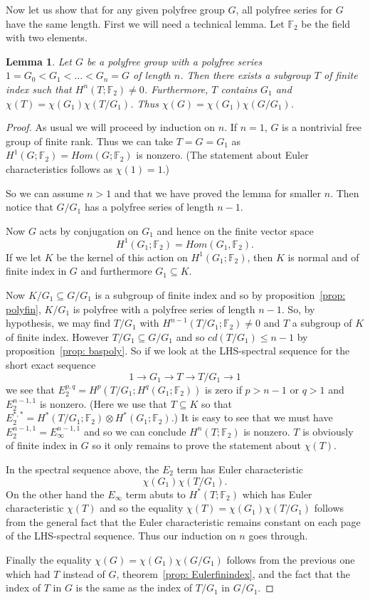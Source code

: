 \documentclass{amsart}
\newtheorem{lem}[thm]{Lemma}
\begin{document}
Now let us show that for any given polyfree group $G$, all polyfree series
for $G$ have the same length. First we will need a technical lemma.
Let $\mathbb{F}_2$ be the field with two elements.

\begin{lem}
\label{lem: lowbound}
Let $G$ be a polyfree group with a polyfree series 
$1=G_0 < G_1 <\dots<G_n=G$ of length $n$.
Then there exists a subgroup $T$ of finite index such that 
$H^n(T;\mathbb{F}_2) \neq 0$. Furthermore, $T$ contains $G_1$ and
$\chi(T) = \chi(G_1)\chi(T/G_1)$. Thus $\chi(G)=\chi(G_1)\chi(G/G_1)$.
\end{lem} 
\begin{proof}
As usual we will proceed by induction on $n$. If $n=1$, $G$ is a nontrivial 
free group of finite
rank. Thus we can take $T=G=G_1$ as $H^1(G;\mathbb{F}_2)=Hom(G;\mathbb{F}_2)$
is nonzero. (The statement about Euler characteristics follows as
$\chi(1)=1$.) 

So we can assume $n>1$ and that we have proved the lemma for smaller $n$.
Then notice that $G/G_1$
has a polyfree series of length $n-1$.

Now $G$ acts by conjugation on $G_1$ and hence on the finite vector space
$$
H^1(G_1;\mathbb{F}_2)=Hom(G_1,\mathbb{F}_2).
$$ 
If we let $K$ be the kernel of this action on
$H^1(G_1;\mathbb{F}_2)$, then $K$ is normal and of finite index in $G$
and furthermore $G_1 \subseteq K$.

Now $K/G_1 \subseteq G/G_1$ is a subgroup of finite index and so by 
proposition~\ref{prop: polyfin}, $K/G_1$ is polyfree with
a polyfree series of length $n-1$. So, by hypothesis, we may find $T/G_1$ with 
$H^{n-1}(T/G_1;\mathbb{F}_2) \neq 0$ and $T$ a subgroup of $K$ of finite index.
However $T/G_1 \subseteq G/G_1$ and so $cd(T/G_1) \leq n-1$ by 
proposition~\ref{prop: baspoly}. So if we look at the LHS-spectral sequence
for the short exact sequence
$$
1 \rightarrow G_1 \rightarrow T \rightarrow T/G_1 \rightarrow 1
$$
we see that $E_2^{p,q}=H^p(T/G_1;H^q(G_1;\mathbb{F}_2))$ is zero if
$p>n-1$ or $q>1$ and $E_2^{n-1,1}$ is nonzero. (Here we use that 
$T \subseteq K$ so that 
$E_2^{*,*}=H^*(T/G_1;\mathbb{F}_2) \otimes H^*(G_1;\mathbb{F}_2)$.)
It is easy to see that
we must have $E_2^{n-1,1}=E_{\infty}^{n-1,1}$ and so we can conclude
$H^n(T;\mathbb{F}_2)$ is nonzero.
$T$ is obviously of finite index in $G$ so it only remains to prove the
statement about $\chi(T)$.

In the spectral sequence above, the $E_2$ term has Euler characteristic
$$
\chi(G_1)\chi(T/G_1).
$$
On the other hand the $E_{\infty}$ term abuts
to $H^*(T;\mathbb{F}_2)$ which has Euler characteristic
$\chi(T)$ and so the equality $\chi(T)=\chi(G_1)\chi(T/G_1)$ follows
from the general fact that the Euler characteristic remains constant
on each page of the LHS-spectral sequence. Thus our induction on $n$ goes
through. 

Finally the equality $\chi(G)=\chi(G_1)\chi(G/G_1)$ follows from
the previous one which had $T$ instead of $G$,
 theorem~\ref{prop: Eulerfinindex}, and the fact that
the index of $T$ in $G$ is the same as the index of $T/G_1$ in $G/G_1$.

\end{proof}
\end{document}
